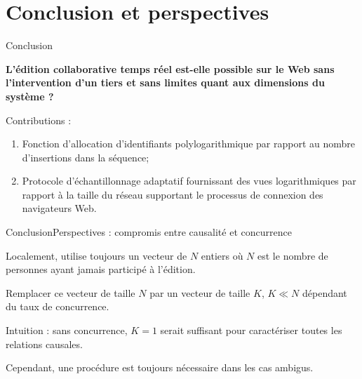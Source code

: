\section{Conclusion et perspectives}

\begin{frame}{Conclusion}
  
  \textbf{\large L'édition collaborative temps réel est-elle possible sur le Web
    sans l'intervention d'un tiers et sans limites quant aux dimensions du
    système ? \YES{\cmark}}

  \vspace{1cm}

  Contributions :
  \begin{enumerate}
  \item %
    Fonction d'allocation d'identifiants polylogarithmique par rapport au nombre
    d'insertions dans la séquence; \vspace{0.2cm}
  \item %
    Protocole d'échantillonnage adaptatif fournissant des vues logarithmiques
    par rapport à la taille du réseau supportant le processus de connexion des
    navigateurs Web.
  \end{enumerate}

\end{frame}


\begin{frame}{Conclusion}{Perspectives : compromis entre causalité et concurrence}
  
  Localement, \CRATE utilise toujours un vecteur de $N$ entiers où $N$ est le
  nombre de personnes ayant jamais participé à l'édition.
  
  \vspace{0.5cm}

  Remplacer ce vecteur de taille $N$ par un vecteur de taille $K$, $K\ll N$
  dépendant du taux de concurrence.

  \vspace{0.5cm}

  Intuition : sans concurrence, $K=1$ serait suffisant pour caractériser toutes
  les relations causales.

  \vspace{0.5cm}

  Cependant, une procédure est toujours nécessaire dans les cas ambigus.

\end{frame}


